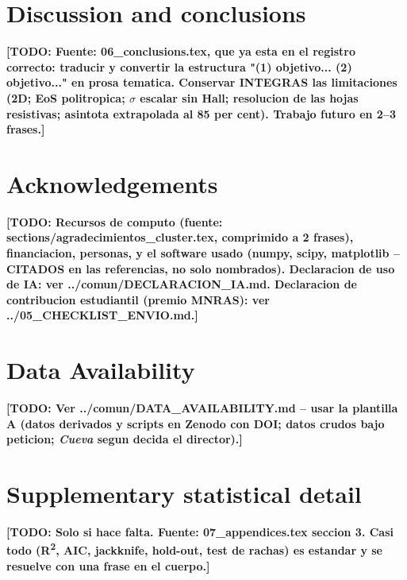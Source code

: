 \documentclass[fleqn,usenatbib]{mnras}
\newcommand{\todo}[1]{\textbf{[TODO: #1]}}
\begin{document}
\section{Discussion and conclusions}
\label{sec:conclusions}

\todo{Fuente: 06\_conclusions.tex, que ya esta en el registro correcto:
traducir y convertir la estructura "(1) objetivo... (2) objetivo..." en prosa
tematica. Conservar INTEGRAS las limitaciones (2D; EoS politropica; $\sigma$
escalar sin Hall; resolucion de las hojas resistivas; asintota extrapolada al
85 per cent). Trabajo futuro en 2--3 frases.}

\section*{Acknowledgements}

\todo{Recursos de computo (fuente: sections/agradecimientos\_cluster.tex,
comprimido a 2 frases), financiacion, personas, y el software usado
(numpy, scipy, matplotlib -- CITADOS en las referencias, no solo nombrados).
Declaracion de uso de IA: ver ../comun/DECLARACION\_IA.md.
Declaracion de contribucion estudiantil (premio MNRAS): ver ../05\_CHECKLIST\_ENVIO.md.}

\section*{Data Availability}

\todo{Ver ../comun/DATA\_AVAILABILITY.md -- usar la plantilla A (datos derivados
y scripts en Zenodo con DOI; datos crudos bajo peticion; \textit{Cueva} segun
decida el director).}




\appendix

\section{Supplementary statistical detail}
\label{app:stats}
\todo{Solo si hace falta. Fuente: 07\_appendices.tex seccion 3.
Casi todo (R\textsuperscript{2}, AIC, jackknife, hold-out, test de rachas) es
estandar y se resuelve con una frase en el cuerpo.}

\bsp	%
\label{lastpage}
\end{document}
